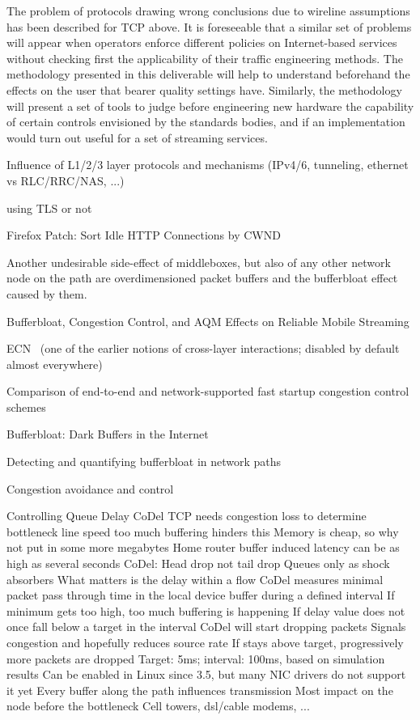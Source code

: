 The problem of protocols drawing wrong conclusions due to wireline assumptions has been described for \gls{TCP} above. It is foreseeable that a similar set of problems will appear when operators enforce different policies on Internet-based services without checking first the applicability of their traffic engineering methods. The methodology presented in this deliverable will help to understand beforehand the effects on the user that bearer quality settings have. Similarly, the methodology will present a set of tools to judge before engineering new hardware the capability of certain controls envisioned by the standards bodies, and if an implementation would turn out useful for a set of streaming services.





 Influence of L1/2/3 layer protocols and mechanisms (IPv4/6, tunneling, ethernet vs RLC/RRC/NAS, ...)


using TLS or not

Firefox Patch: Sort Idle HTTP Connections by CWND \cite{ffSortCWND}



Another undesirable side-effect of middleboxes, but also of any other network node on the path are overdimensioned packet buffers and the bufferbloat effect caused by them.

Bufferbloat, Congestion Control, and AQM Effects on Reliable Mobile Streaming

 ECN~\cite{rfc3168} (one of the earlier notions of cross-layer interactions; disabled by default almost everywhere)

Comparison of end-to-end and network-supported fast startup congestion control schemes \cite{scharf2011comparison}

Bufferbloat: Dark Buffers in the Internet \cite{gettys2011bufferbloat}

Detecting and quantifying bufferbloat in network paths \cite{groenewegen2011detecting}

Congestion avoidance and control \cite{jacobson1988congestion}

Controlling Queue Delay \cite{Nichols:2012:CQD:2209249.2209264} CoDel\cite{nichols2014codel}
 TCP needs congestion loss to determine bottleneck line speed
	too much buffering hinders this
 Memory is cheap, so why not put in some more megabytes
 Home router buffer induced latency can be as high as several seconds
CoDel:
 Head drop not tail drop
 Queues only as shock absorbers
 What matters is the delay within a flow
 CoDel measures minimal packet pass through time in the local device buffer during a defined interval
 If minimum gets too high, too much buffering is happening
 If delay value does not once fall below a target in the interval CoDel will start dropping packets
	Signals congestion and hopefully reduces source rate
	If stays above target, progressively more packets are dropped
	Target: 5ms; interval: 100ms, based on simulation results
 Can be enabled in Linux since 3.5, but many NIC drivers do not support it yet
 Every buffer along the path influences transmission
	Most impact on the node before the bottleneck
	Cell towers, dsl/cable modems, ...




